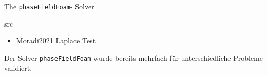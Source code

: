 The \texttt{phaseFieldFoam}- Solver 


src 

\begin{itemize}
    \item Moradi2021 Laplace Test
\end{itemize}


Der Solver \texttt{phaseFieldFoam} wurde bereits mehrfach für unterschiedliche Probleme validiert. 


